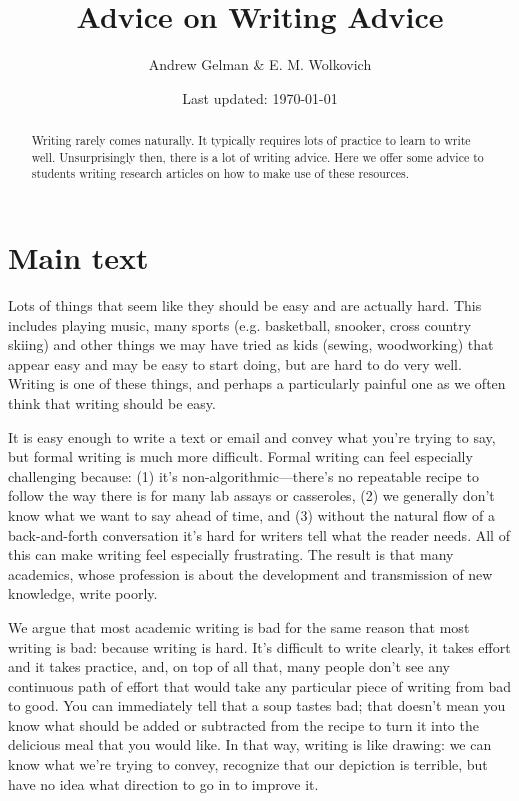 \documentclass[11pt,letter]{article}
\begin{document}


\title{Advice on Writing Advice}
\author{Andrew Gelman  \& E. M. Wolkovich}
\date{Last updated: \today}
\maketitle

\begin{abstract}
Writing rarely comes naturally. It typically requires lots of practice to learn to write well.  Unsurprisingly then, there is a lot of writing advice. Here we offer some advice to students writing research articles on how to make use of these resources. 
\end{abstract}

\section{Main text} %

Lots of things that seem like they should be easy and are actually hard. This includes playing music, many sports (e.g. basketball, snooker, cross country skiing) and other things we may have tried as kids (sewing, woodworking) that appear easy and may be easy to start doing, but are hard to do very well. Writing is one of these things, and perhaps a particularly painful one as we often think that writing should be easy. 

It is easy enough to write a text or email and convey what you’re trying to say, but formal writing is much more difficult. Formal writing can feel especially challenging because: (1) it's non-algorithmic---there's no repeatable recipe to follow the way there is for many lab assays or casseroles, (2) we generally don't know what we want to say ahead of time, and (3) without the natural flow of a back-and-forth conversation it's hard for writers tell what the reader needs. All of this can make writing feel especially frustrating. The result is that many academics, whose profession is about the development and transmission of new knowledge, write poorly. 

We argue that most academic writing is bad for the same reason that most writing is bad: because writing is hard.  It’s difficult to write clearly, it takes effort and it takes practice, and, on top of all that, many people don’t see any continuous path of effort that would take any particular piece of writing from bad to good.  You can immediately tell that a soup tastes bad; that doesn’t mean you know what should be added or subtracted from the recipe to turn it into the delicious meal that you would like.  In that way, writing is like drawing:  we can know what we’re trying to convey, recognize that our depiction is terrible, but have no idea what direction to go in to improve it.
\end{document}
